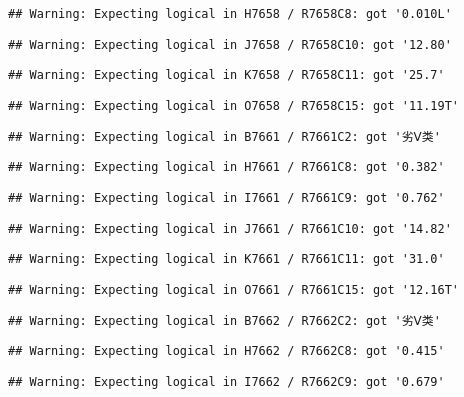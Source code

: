 \documentclass[
]{article}
\begin{document}
\begin{verbatim}
## Warning: Expecting logical in H7658 / R7658C8: got '0.010L'
\end{verbatim}

\begin{verbatim}
## Warning: Expecting logical in J7658 / R7658C10: got '12.80'
\end{verbatim}

\begin{verbatim}
## Warning: Expecting logical in K7658 / R7658C11: got '25.7'
\end{verbatim}

\begin{verbatim}
## Warning: Expecting logical in O7658 / R7658C15: got '11.19T'
\end{verbatim}

\begin{verbatim}
## Warning: Expecting logical in B7661 / R7661C2: got '劣Ⅴ类'
\end{verbatim}

\begin{verbatim}
## Warning: Expecting logical in H7661 / R7661C8: got '0.382'
\end{verbatim}

\begin{verbatim}
## Warning: Expecting logical in I7661 / R7661C9: got '0.762'
\end{verbatim}

\begin{verbatim}
## Warning: Expecting logical in J7661 / R7661C10: got '14.82'
\end{verbatim}

\begin{verbatim}
## Warning: Expecting logical in K7661 / R7661C11: got '31.0'
\end{verbatim}

\begin{verbatim}
## Warning: Expecting logical in O7661 / R7661C15: got '12.16T'
\end{verbatim}

\begin{verbatim}
## Warning: Expecting logical in B7662 / R7662C2: got '劣Ⅴ类'
\end{verbatim}

\begin{verbatim}
## Warning: Expecting logical in H7662 / R7662C8: got '0.415'
\end{verbatim}

\begin{verbatim}
## Warning: Expecting logical in I7662 / R7662C9: got '0.679'
\end{verbatim}
\end{document}
